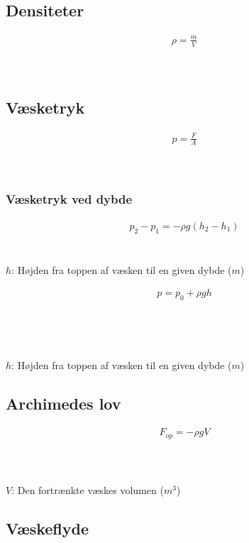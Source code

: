 \subsection{Densiteter}
	\begin{align}
		\rho=\frac{m}{V}
	\end{align}
	\densitet\\
	\masse\\
	\volumen

\subsection{Væsketryk}
	\begin{align}
		p=\frac{F}{A}
	\end{align}
	\tryk\\
	\kraft\\
	\areal
	\newpage

	\subsubsection{Væsketryk ved dybde}
		\begin{align}
			p_2-p_1=-\rho g(h_2-h_1)
		\end{align}
		\tryk\\
		\densitet\\
		$h$: Højden fra toppen af væsken til en given dybde ($m$)\\
		\tyngde

		\begin{align}
			p=p_0+\rho gh
		\end{align}
		\tryk\\
		\trykbeg\\
		\densitet\\
		\tyngde\\
		$h$: Højden fra toppen af væsken til en given dybde ($m$)
		
\subsection{Archimedes lov}
	\begin{align}
		F_{op}=-\rho gV
	\end{align}
	\kraft\\
	\densitet\\
	\tyngde\\
	$V$: Den fortrænkte væskes volumen ($m^3$)

\subsection{Væskeflyde}
